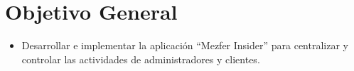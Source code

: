 \section{Objetivo General}
    \begin{itemize}
        \item Desarrollar e implementar la aplicación ``Mezfer Insider'' para centralizar y controlar las actividades de administradores y clientes.
    \end{itemize}